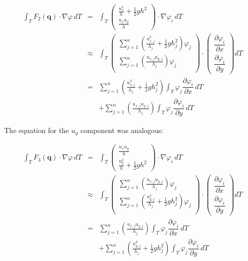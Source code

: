 \documentclass{article}
\newcommand{\pd}[2]{\dfrac{\partial #1}{\partial #2}}
\renewcommand{\phi}{\varphi}
\begin{document}
\begin{eqnarray}
  \label{eq:third-integral-second-line-1-analysis-part}
  \int_T F_2(\mathbf{q}) \cdot \nabla \phi \, dT & = &
  \int_T
  \begin{pmatrix}
    \frac{u_x^2}{h} + \frac{1}{2} g h^2 \\ \frac{u_x u_y}{h}
  \end{pmatrix}
  \cdot \nabla \phi_i \, dT \\
  \label{eq:third-integral-second-line-2-analysis-part}
  & \approx &
  \int_T
  \begin{pmatrix}
    \sum_{j=1}^n \left(\frac{u_{x,j}^2}{h_j} + \frac{1}{2} g h_j^2\right) \phi_j \\
    \sum_{j=1}^n \left(\frac{u_{x,j} u_{y,j}}{h_j}\right) \phi_j \\
  \end{pmatrix}
  \cdot
  \begin{pmatrix}
    \pd{\phi_i}{x} \\
    \pd{\phi_i}{y}
  \end{pmatrix} dT \\
  & = & \nonumber \sum_{j=1}^n \left(\frac{u_{x,j}^2}{h_j} + \frac{1}{2} g h_j^2\right) \int_T \phi_j \pd{\phi_i}{x} \, dT \\
  & {} & + \nonumber \sum_{j=1}^n \left(\frac{u_{x,j} u_{y,j}}{h_j}\right) \int_T \phi_j \pd{\phi_i}{y} \, dT
\end{eqnarray}

The equation for the $u_y$ component was analogous:

\begin{eqnarray*}
  \int_T F_3\left(\mathbf{q}\right) \cdot \nabla \phi \, dT & = &
  \int_T
  \begin{pmatrix}
    \frac{u_x u_y}{h} \\ \frac{u_y^2}{h} + \frac{1}{2} g h^2
  \end{pmatrix}
  \cdot \nabla \phi_i \, dT \\
  & \approx & \int_T
  \begin{pmatrix}
    \sum_{j=1}^n \left(\frac{u_{x,j} u_{y,j}}{h_j}\right) \phi_j \\
    \sum_{j=1}^n \left(\frac{u_{y,j}^2}{h_j} + \frac{1}{2} g h_j^2\right) \phi_j \\
  \end{pmatrix}
  \cdot
  \begin{pmatrix}
    \pd{\phi_i}{x} \\
    \pd{\phi_i}{y}
  \end{pmatrix} dT \\
  & = & \sum_{j=1}^n \left(\frac{u_{x,j} u_{y,j}}{h_j}\right) \int_T \phi_j \pd{\phi_i}{x} \, dT \\
  & {} & + \sum_{j=1}^n \left(\frac{u_{y,j}^2}{h_j} + \frac{1}{2} g h_j^2\right) \int_T \phi_j \pd{\phi_i}{y} \, dT
\end{eqnarray*}
\end{document}
